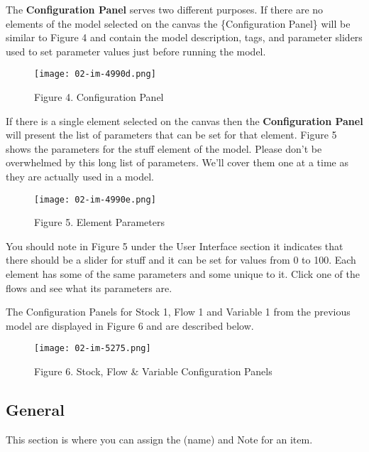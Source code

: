 \documentclass[]{memoir}
\makeatletter
\def\maxwidth{\ifdim\Gin@nat@width>\linewidth\linewidth
\else\Gin@nat@width\fi}
\let\Oldincludegraphics\includegraphics
\renewcommand{\includegraphics}[1]{\Oldincludegraphics[width=\maxwidth]{#1}}
\renewcommand{\u}[1]{\textbf{#1}}
\makeatother
\begin{document}
The \u{Configuration Panel} serves two different purposes. If there are
no elements of the model selected on the canvas the \{Configuration
Panel\} will be similar to Figure 4 and contain the model description,
tags, and parameter sliders used to set parameter values just before
running the model.

\begin{figure}[htbp]
\centering
\texttt{[image: 02-im-4990d.png]}
\caption{Figure 4. Configuration Panel}
\end{figure}

If there is a single element selected on the canvas then the
\u{Configuration Panel} will present the list of parameters that can be
set for that element. Figure 5 shows the parameters for the stuff
element of the model. Please don't be overwhelmed by this long list of
parameters. We'll cover them one at a time as they are actually used in
a model.

\begin{figure}[htbp]
\centering
\texttt{[image: 02-im-4990e.png]}
\caption{Figure 5. Element Parameters}
\end{figure}

You should note in Figure 5 under the User Interface section it
indicates that there should be a slider for stuff and it can be set for
values from 0 to 100. Each element has some of the same parameters and
some unique to it. Click one of the flows and see what its parameters
are.

The Configuration Panels for Stock 1, Flow 1 and Variable 1 from the
previous model are displayed in Figure 6 and are described below.

\begin{figure}[htbp]
\centering
\texttt{[image: 02-im-5275.png]}
\caption{Figure 6. Stock, Flow \& Variable Configuration Panels}
\end{figure}

\subsection{General}

This section is where you can assign the (name) and Note for an item.
\end{document}

